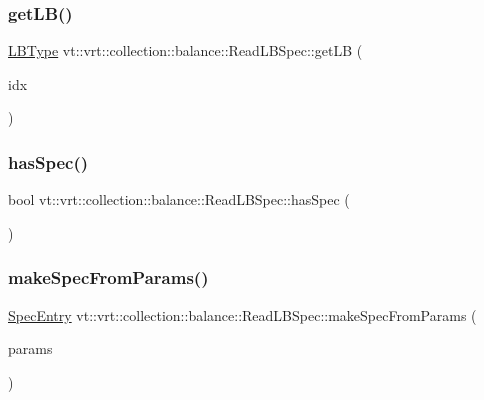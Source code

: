 \subsubsection{\texorpdfstring{get\+L\+B()}{getLB()}}
{\footnotesize\ttfamily \hyperlink{namespacevt_1_1vrt_1_1collection_1_1balance_ac4f99693509affcc67db182d4aad9b5c}{L\+B\+Type} vt\+::vrt\+::collection\+::balance\+::\+Read\+L\+B\+Spec\+::get\+LB (\begin{DoxyParamCaption}\item[{\hyperlink{namespacevt_1_1vrt_1_1collection_1_1balance_a72a5e0d9936ddf57f8e6c64e0e9fd123}{Spec\+Index} const \&}]{idx }\end{DoxyParamCaption})\hspace{0.3cm}{\ttfamily [static]}}

\mbox{\label{structvt_1_1vrt_1_1collection_1_1balance_1_1_read_l_b_spec_a38f65064cd81275eb9c9d596d0f0a35f}} 
\subsubsection{\texorpdfstring{has\+Spec()}{hasSpec()}}
{\footnotesize\ttfamily bool vt\+::vrt\+::collection\+::balance\+::\+Read\+L\+B\+Spec\+::has\+Spec (\begin{DoxyParamCaption}{ }\end{DoxyParamCaption})\hspace{0.3cm}{\ttfamily [static]}}

\mbox{\label{structvt_1_1vrt_1_1collection_1_1balance_1_1_read_l_b_spec_a4a3fc33794511c6d74d6e4a70eb72682}} 
\subsubsection{\texorpdfstring{make\+Spec\+From\+Params()}{makeSpecFromParams()}}
{\footnotesize\ttfamily \hyperlink{structvt_1_1vrt_1_1collection_1_1balance_1_1_spec_entry}{Spec\+Entry} vt\+::vrt\+::collection\+::balance\+::\+Read\+L\+B\+Spec\+::make\+Spec\+From\+Params (\begin{DoxyParamCaption}\item[{std\+::string}]{params }\end{DoxyParamCaption})\hspace{0.3cm}{\ttfamily [static]}}

